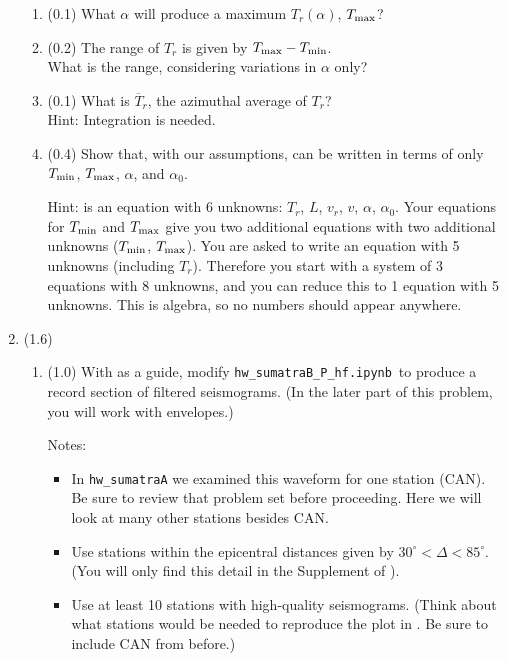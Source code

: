 \documentclass[11pt,titlepage,fleqn]{article}
\newcommand{\tfilehf}{{\tt hw\_sumatraB\_P\_hf.ipynb}}
\begin{document}
\begin{enumerate}
\begin{enumerate}
\item (0.1) What $\alpha$ will produce a maximum $T_r(\alpha)$, $T_{\rm max}$?
\item (0.2) The range of $T_r$ is given by $T_{\rm max} - T_{\rm min}$. \\
What is the range, considering variations in $\alpha$ only?
\item (0.1) What is $\overline{T}_r$, the azimuthal average of $T_r$? \\
Hint: Integration is needed.
\item (0.4) Show that, with our assumptions,  can be written in terms of only $T_{\rm min}$, $T_{\rm max}$, $\alpha$, and $\alpha_0$.

Hint:  is an equation with 6 unknowns: $T_r$, $L$, $v_r$, $v$, $\alpha$, $\alpha_0$. Your equations for $T_{\rm min}$ and $T_{\rm max}$ give you two additional equations with two additional unknowns ($T_{\rm min}$, $T_{\rm max}$). You are asked to write an equation with 5 unknowns (including $T_r$). Therefore you start with a system of 3 equations with 8 unknowns, and you can reduce this to 1 equation with 5 unknowns. This is algebra, so no numbers should appear anywhere.

\end{enumerate}


\item (1.6) 
\begin{enumerate}
\item (1.0) With \citet[][Figure~1d]{Ni2005} as a guide, modify \tfilehf\ to produce a record section of filtered seismograms. (In the later part of this problem, you will work with envelopes.)

Notes:
%
\begin{itemize}
\item In \verb+hw_sumatraA+ we examined this waveform for one station (CAN). Be sure to review that problem set before proceeding. Here we will look at many other stations besides CAN.

\item Use stations within the epicentral distances given by $30^\circ < \Delta < 85^\circ$. (You will only find this detail in the Supplement of \citet{Ni2005}).

\item Use at least 10 stations with high-quality seismograms. (Think about what stations would be needed to reproduce the plot in \citet{Ni2005}. Be sure to include CAN from before.)


\end{itemize}
\end{enumerate}
\end{enumerate}
\end{document}
